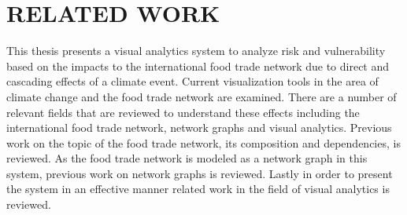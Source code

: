 \chapter{RELATED WORK}
\label{relatedWorkChapter}
This thesis presents a visual analytics system to analyze risk and vulnerability based on the impacts to the international food trade network due to direct and cascading effects of a climate event. Current visualization tools in the area of climate change and the food trade network are examined. There are a number of relevant fields that are reviewed to understand these effects including the international food trade network, network graphs and visual analytics. Previous work on the topic of the food trade network, its composition and dependencies, is reviewed. As the food trade network is modeled as a network graph in this system, previous work on network graphs is reviewed. Lastly in order to present the system in an effective manner related work in the field of visual analytics is reviewed.\par

